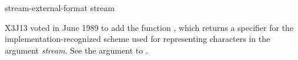 \begin{newer}
\begin{defun}[Function]
stream-external-format stream

X3J13 voted in June 1989  to add the
function , which returns a
specifier for the implementation-recognized scheme used for
representing characters in the argument \emph{stream}.
See the  argument to .
\end{defun}
\end{newer}
